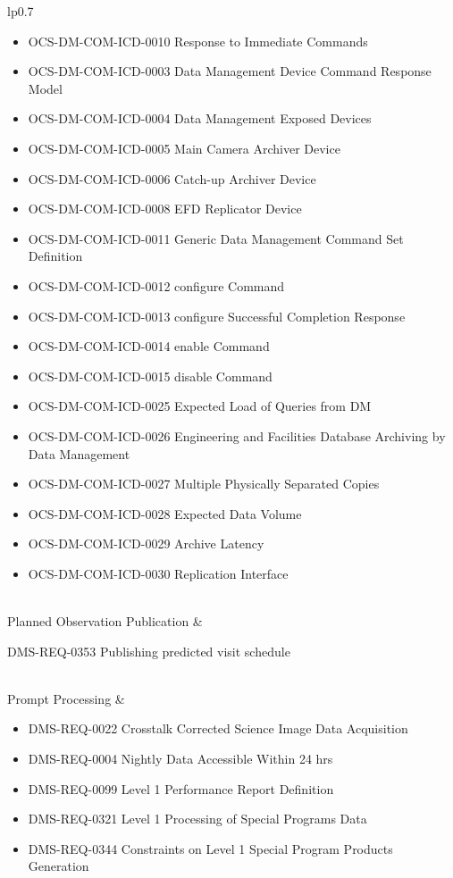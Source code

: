 \begin{xtabular}{lp{0.7\textwidth}}
\begin{itemize}
\item OCS-DM-COM-ICD-0010 Response to Immediate Commands
\item OCS-DM-COM-ICD-0003 Data Management Device Command Response Model
\item OCS-DM-COM-ICD-0004 Data Management Exposed Devices
\item OCS-DM-COM-ICD-0005 Main Camera Archiver Device
\item OCS-DM-COM-ICD-0006 Catch-up Archiver Device
\item OCS-DM-COM-ICD-0008 EFD Replicator Device
\item OCS-DM-COM-ICD-0011 Generic Data Management Command Set Definition
\item OCS-DM-COM-ICD-0012 configure Command
\item OCS-DM-COM-ICD-0013 configure Successful Completion Response
\item OCS-DM-COM-ICD-0014 enable Command
\item OCS-DM-COM-ICD-0015 disable Command
\item OCS-DM-COM-ICD-0025 Expected Load of Queries from DM
\item OCS-DM-COM-ICD-0026 Engineering and Facilities Database Archiving by Data Management
\item OCS-DM-COM-ICD-0027 Multiple Physically Separated Copies
\item OCS-DM-COM-ICD-0028 Expected Data Volume
\item OCS-DM-COM-ICD-0029 Archive Latency
\item OCS-DM-COM-ICD-0030 Replication Interface
\end{itemize} \\ \hline
Planned Observation Publication &
\begin{itemize}DMS-REQ-0353 Publishing predicted visit schedule
\end{itemize} \\ \hline
Prompt Processing &
\begin{itemize}DMS-REQ-0346 Data Availability
\item DMS-REQ-0022 Crosstalk Corrected Science Image Data Acquisition
\item DMS-REQ-0004 Nightly Data Accessible Within 24 hrs
\item DMS-REQ-0099 Level 1 Performance Report Definition
\item DMS-REQ-0321 Level 1 Processing of Special Programs Data
\item DMS-REQ-0344 Constraints on Level 1 Special Program Products Generation

\end{itemize}
\end{xtabular}
